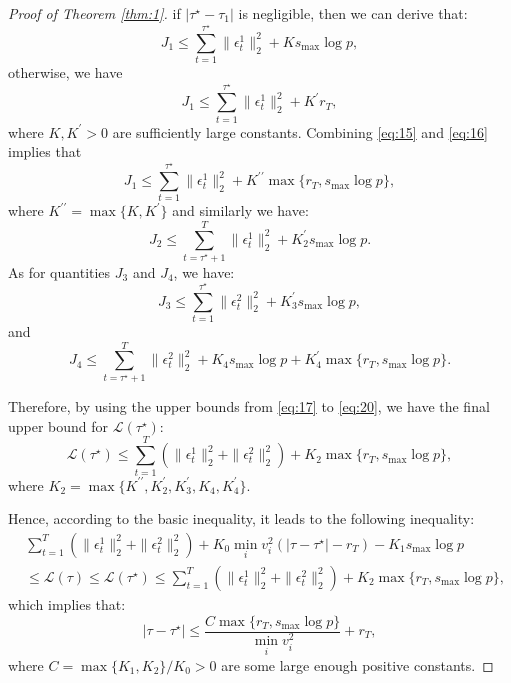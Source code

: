 \documentclass[11pt]{article}
\begin{document}
\begin{proof}[Proof of Theorem \ref{thm:1}]
if $|\tau^\star - \tau_1|$ is negligible, then we can derive that:
\begin{equation}
    \label{eq:15}
    J_1 \leq \sum_{t=1}^{\tau^\star}\|\epsilon_t^1\|_2^2 + Ks_{\max}\log p,
\end{equation}
otherwise, we have 
\begin{equation}
    \label{eq:16}
    J_1 \leq \sum_{t=1}^{\tau^\star}\|\epsilon_t^1\|_2^2 + K^\prime r_T,
\end{equation}
where $K, K^\prime>0$ are sufficiently large constants. Combining \eqref{eq:15} and \eqref{eq:16} implies that
\begin{equation}
    \label{eq:17}
    J_1 \leq \sum_{t=1}^{\tau^\star}\|\epsilon_t^1\|_2^2 + K^{\prime\prime} \max\{r_T, s_{\max}\log p\},
\end{equation}
where $K^{\prime\prime} = \max\{K, K^\prime\}$ and similarly we have:
\begin{equation}
    \label{eq:18}
    J_2 \leq \sum_{t=\tau^\star+1}^T\|\epsilon_t^1\|_2^2 + K_2^\prime s_{\max}\log p.
\end{equation}
As for quantities $J_3$ and $J_4$, we have:
\begin{equation}
    \label{eq:19}
    J_3 \leq \sum_{t=1}^{\tau^\star}\|\epsilon_t^2\|_2^2 + K_3^\prime s_{\max}\log p,
\end{equation}
and
\begin{equation}
    \label{eq:20}
    J_4 \leq \sum_{t=\tau^\star+1}^T \|\epsilon_t^2\|_2^2 + K_4 s_{\max}\log p + K_4^{\prime} \max\{r_T, s_{\max}\log p\}.
\end{equation}

Therefore, by using the upper bounds from \eqref{eq:17} to \eqref{eq:20}, we have the final upper bound for $\mathcal{L}(\tau^\star)$:
\begin{equation}
    \label{eq:21}
    \mathcal{L}(\tau^\star) \leq \sum_{t=1}^T(\|\epsilon_t^1\|_2^2 + \|\epsilon_t^2\|_2^2) + K_2 \max\{r_T, s_{\max}\log p\},
\end{equation}
where $K_2 = \max\{K^{\prime\prime}, K_2^\prime, K_3^\prime, K_4, K_4^\prime\}$.

Hence, according to the basic inequality, it leads to the following inequality:
\begin{equation*}
    \begin{aligned}
        &\sum_{t=1}^T(\|\epsilon_t^1\|_2^2 + \|\epsilon_t^2\|_2^2) + K_0 \min_i v_i^2\left(|\tau-\tau^\star| - r_T\right) - K_1s_{\max}\log p \\
        &\leq \mathcal{L}(\tau) \leq \mathcal{L}(\tau^\star) \leq \sum_{t=1}^T(\|\epsilon_t^1\|_2^2 + \|\epsilon_t^2\|_2^2) + K_2\max\{r_T, s_{\max}\log p\},
    \end{aligned}
\end{equation*}
which implies that:
\begin{equation}
    \label{eq:22}
    |\tau - \tau^\star| \leq \frac{C\max\{r_T, s_{\max}\log p\}}{\min_i v_i^2} + r_T,
\end{equation}
where $C = \max\{K_1, K_2\}/K_0 > 0$ are some large enough positive constants. 


\end{proof}
\end{document}
